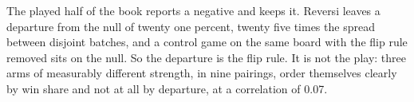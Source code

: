 The played half of the book reports a negative and keeps it. Reversi leaves a departure from the
null of twenty one percent, twenty five times the spread between disjoint batches, and a control
game on the same board with the flip rule removed sits on the null. So the departure is the flip
rule. It is not the play: three arms of measurably different strength, in nine pairings, order
themselves clearly by win share and not at all by departure, at a correlation of 0.07.
\cleardoublepage
